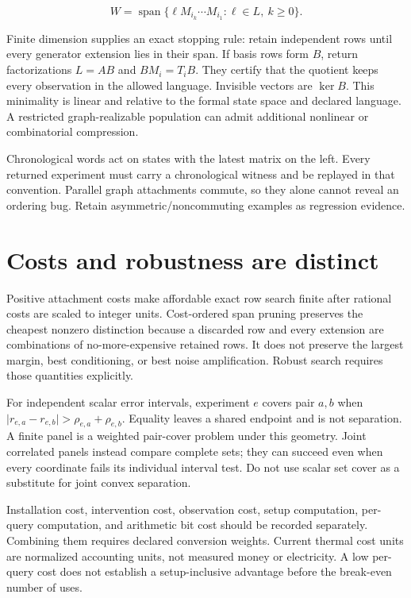 \documentclass[
  11pt,
  a4paper,
]{report}
\begin{document}
\[
W=\operatorname{span}\{\ell M_{i_k}\cdots M_{i_1}:\ell\in L,\ k\ge0\}.
\]

Finite dimension supplies an exact stopping rule: retain independent
rows until every generator extension lies in their span. If basis rows
form \(B\), return factorizations \(L=AB\) and \(BM_i=T_iB\). They
certify that the quotient keeps every observation in the allowed
language. Invisible vectors are \(\ker B\). This minimality is linear
and relative to the formal state space and declared language. A
restricted graph-realizable population can admit additional nonlinear or
combinatorial compression.

Chronological words act on states with the latest matrix on the left.
Every returned experiment must carry a chronological witness and be
replayed in that convention. Parallel graph attachments commute, so they
alone cannot reveal an ordering bug. Retain asymmetric/noncommuting
examples as regression evidence.

\hypertarget{costs-and-robustness-are-distinct}{%
\section{Costs and robustness are
distinct}\label{costs-and-robustness-are-distinct}}

Positive attachment costs make affordable exact row search finite after
rational costs are scaled to integer units. Cost-ordered span pruning
preserves the cheapest nonzero distinction because a discarded row and
every extension are combinations of no-more-expensive retained rows. It
does not preserve the largest margin, best conditioning, or best noise
amplification. Robust search requires those quantities explicitly.

For independent scalar error intervals, experiment \(e\) covers pair
\(a,b\) when \(\lvert r_{e,a}-r_{e,b}\rvert>\rho_{e,a}+\rho_{e,b}\).
Equality leaves a shared endpoint and is not separation. A finite panel
is a weighted pair-cover problem under this geometry. Joint correlated
panels instead compare complete sets; they can succeed even when every
coordinate fails its individual interval test. Do not use scalar set
cover as a substitute for joint convex separation.

Installation cost, intervention cost, observation cost, setup
computation, per-query computation, and arithmetic bit cost should be
recorded separately. Combining them requires declared conversion
weights. Current thermal cost units are normalized accounting units, not
measured money or electricity. A low per-query cost does not establish a
setup-inclusive advantage before the break-even number of uses.
\end{document}
